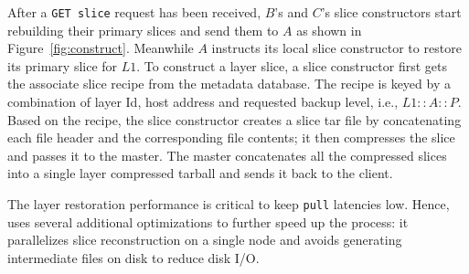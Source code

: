 After a \texttt{GET slice} request has been received, 
$B$'s and $C$'s slice constructors start rebuilding their primary slices and send them to $A$ as shown in Figure~\ref{fig:construct}.
Meanwhile $A$ instructs its local slice constructor to restore its primary slice for $L1$.
%
To construct a layer slice, a slice constructor first gets the associate slice recipe
from the metadata database. The recipe is keyed by a combination of layer Id, host address and requested
backup level, i.e., $L1::A::P$.
%
Based on the recipe, the slice constructor creates a slice tar file by concatenating each file header and the corresponding
file contents; it then compresses the slice and passes it to the master.
%
The master concatenates all the compressed slices into a single
layer compressed tarball and sends it back to the client.


The layer restoration performance is critical to keep \texttt{pull} latencies low. Hence,
\sysname uses several additional optimizations to further speed up the process:
it parallelizes slice reconstruction on a single node and
avoids generating intermediate files on disk to reduce disk I/O.
%
%


